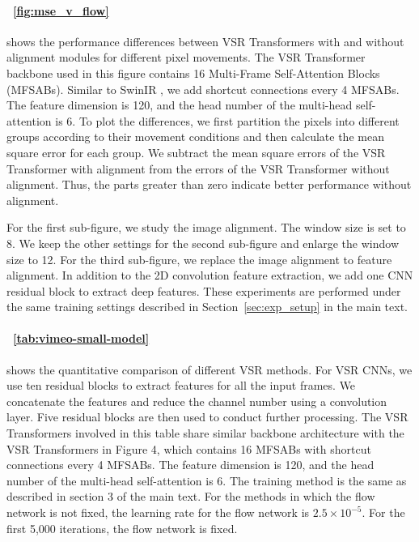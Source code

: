 \documentclass{article}
\begin{document}
\paragraph{\figurename~\ref{fig:mse_v_flow}}
shows the performance differences between VSR Transformers with and without alignment modules for different pixel movements.
The VSR Transformer backbone used in this figure contains 16 Multi-Frame Self-Attention Blocks (MFSABs).
Similar to SwinIR \cite{liang2021swinir}, we add shortcut connections every 4 MFSABs.
The feature dimension is 120, and the head number of the multi-head self-attention is 6.
To plot the differences, we first partition the pixels into different groups according to their movement conditions and then calculate the mean square error for each group.
We subtract the mean square errors of the VSR Transformer with alignment from the errors of the VSR Transformer without alignment.
Thus, the parts greater than zero indicate better performance without alignment.


For the first sub-figure, we study the image alignment.
The window size is set to 8.
We keep the other settings for the second sub-figure and enlarge the window size to 12.
For the third sub-figure, we replace the image alignment to feature alignment.
In addition to the 2D convolution feature extraction, we add one CNN residual block to extract deep features.
These experiments are performed under the same training settings described in Section~\ref{sec:exp_setup} in the main text.

\vspace{-3mm}
\paragraph{\tablename~\ref{tab:vimeo-small-model}}
shows the quantitative comparison of different VSR methods.
For VSR CNNs, we use ten residual blocks \cite{lim2017enhanced} to extract features for all the input frames.
We concatenate the features and reduce the channel number using a convolution layer.
Five residual blocks are then used to conduct further processing.
The VSR Transformers involved in this table share similar backbone architecture with the VSR Transformers in Figure 4, which contains 16 MFSABs with shortcut connections every 4 MFSABs.
The feature dimension is 120, and the head number of the multi-head self-attention is 6.
The training method is the same as described in section 3 of the main text.
For the methods in which the flow network is not fixed, the learning rate for the flow network is $2.5\times10^{-5}$.
For the first 5,000 iterations, the flow network is fixed.
\end{document}
